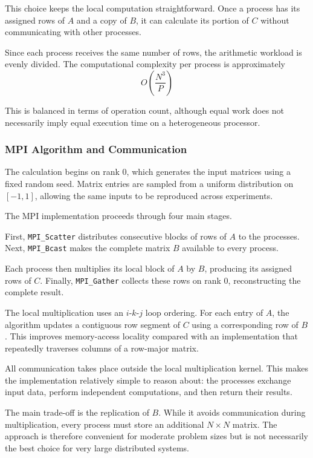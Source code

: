This choice keeps the local computation straightforward. Once a process has its assigned rows of $A$ and a copy of $B$, it can calculate its portion of $C$ without communicating with other processes.

Since each process receives the same number of rows, the arithmetic workload is evenly divided. The computational complexity per process is approximately
\begin{equation}
	O\left(\frac{N^3}{P}\right)
\end{equation}

This is balanced in terms of operation count, although equal work does not necessarily imply equal execution time on a heterogeneous processor.

\subsubsection{MPI Algorithm and Communication}

The calculation begins on rank 0, which generates the input matrices using a fixed random seed. Matrix entries are sampled from a uniform distribution on $[-1,1]$, allowing the same inputs to be reproduced across experiments.

The MPI implementation proceeds through four main stages.

First, \texttt{MPI\_Scatter} distributes consecutive blocks of rows of $A$ to the processes. Next, \texttt{MPI\_Bcast} makes the complete matrix $B$ available to every process.

Each process then multiplies its local block of $A$ by $B$, producing its assigned rows of $C$. Finally, \texttt{MPI\_Gather} collects these rows on rank 0, reconstructing the complete result.

The local multiplication uses an $i$-$k$-$j$ loop ordering. For each entry of $A$, the algorithm updates a contiguous row segment of $C$ using a corresponding row of $B$. This improves memory-access locality compared with an implementation that repeatedly traverses columns of a row-major matrix.

All communication takes place outside the local multiplication kernel. This makes the implementation relatively simple to reason about: the processes exchange input data, perform independent computations, and then return their results.

The main trade-off is the replication of $B$. While it avoids communication during multiplication, every process must store an additional $N\times N$ matrix. The approach is therefore convenient for moderate problem sizes but is not necessarily the best choice for very large distributed systems.

